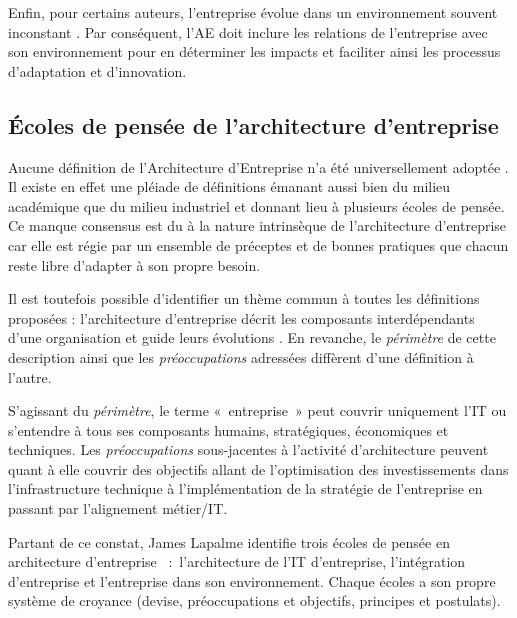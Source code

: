 Enfin, pour certains auteurs, l'entreprise évolue dans un environnement souvent inconstant \cite{lapalme2012three}. Par conséquent, l'AE 
doit inclure les relations de l'entreprise avec son environnement pour en 
déterminer les impacts et faciliter ainsi les processus d'adaptation  et 
d'innovation.


	\subsection{Écoles de pensée de l'architecture d'entreprise} 

Aucune définition de l'Architecture d'Entreprise n'a été universellement adoptée \cite{mentz2012comparison} \cite{ranganathan2005enterprise}. Il existe en effet une pléiade de définitions émanant aussi bien du milieu académique que du milieu industriel et donnant lieu à plusieurs écoles de pensée. Ce manque consensus est du à la nature intrinsèque de l'architecture d'entreprise car elle est régie par un ensemble de préceptes et de bonnes pratiques que chacun reste libre d'adapter à son propre besoin. 

Il est toutefois possible d'identifier un thème commun à toutes les définitions 
proposées : l'architecture d'entreprise décrit les composants interdépendants 
d'une organisation et guide leurs évolutions \cite{lapalme2012three}. En 
revanche, le \textit{périmètre} de cette description ainsi que les \textit{préoccupations} 
adressées diffèrent d'une définition à l'autre.

S'agissant du \textit{périmètre}, le terme «~entreprise~» peut couvrir uniquement l'IT  ou s'entendre à tous ses composants humains, stratégiques, économiques et techniques. Les \textit{préoccupations} sous-jacentes à l'activité d'architecture peuvent quant à elle couvrir des objectifs allant de l'optimisation des investissements dans l'infrastructure technique à l'implémentation de la stratégie de l'entreprise en passant par l'alignement métier/IT. 

Partant de ce constat, James Lapalme identifie trois écoles de pensée en architecture d'entreprise \cite{lapalme2012three}~:~l'architecture de l'IT d'entreprise, l'intégration 
d'entreprise et l'entreprise dans son environnement. Chaque écoles a son 
propre système de croyance (devise, préoccupations et objectifs, principes et 
postulats).



